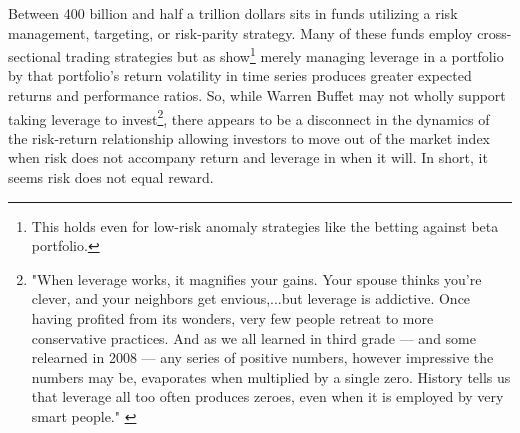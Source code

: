 \noindent %
Between 400 billion and half a trillion dollars sits in funds utilizing a risk management, targeting, or risk-parity strategy. \citep{cao_risk_2016,verma_volatility-targeting_2018} Many of these funds employ cross-sectional trading strategies but as \citet{moreira_volatility-managed_2017} show\footnote{This holds even for low-risk anomaly strategies like the \citet{frazzini_betting_2014} betting against beta portfolio.} merely managing leverage in a portfolio by that portfolio's return volatility in time series produces greater expected returns and performance ratios. So, while Warren Buffet may not wholly support taking leverage to invest\footnote{"When leverage works, it magnifies your gains. Your spouse thinks you're clever, and your neighbors get envious,...but leverage is addictive. Once having profited from its wonders, very few people retreat to more conservative practices. And as we all learned in third grade — and some relearned in 2008 — any series of positive numbers, however impressive the numbers may be, evaporates when multiplied by a single zero. History tells us that leverage all too often produces zeroes, even when it is employed by very smart people." \citep{noauthor_warren_nodate}}, there appears to be a disconnect in the dynamics of the risk-return relationship allowing investors to move out of the market index when risk does not accompany return and leverage in when it will. In short, it seems risk does not equal reward. %
